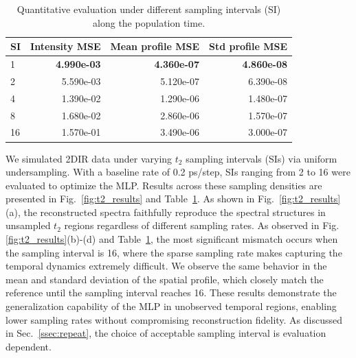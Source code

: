 \documentclass{optica-article}
\begin{document}
\begin{table}[t]
\centering
\caption{Quantitative evaluation under different sampling intervals (SI) along the population time.}
\label{tab:t2_results}
\begin{tabular}{lrrr}
\toprule
SI & Intensity MSE & Mean profile MSE & Std profile MSE \\
\midrule
1  & \textbf{4.990e-03} & \textbf{4.360e-07} & \textbf{4.860e-08} \\
2  & 5.590e-03 & 5.120e-07 & 6.390e-08 \\
4  & 1.390e-02 & 1.290e-06 & 1.480e-07 \\
8  & 1.680e-02 & 2.860e-06 & 1.570e-07 \\
16 & 1.570e-01 & 3.490e-06 & 3.000e-07 \\
\bottomrule
\end{tabular}
\vspace{-3mm}
\end{table}

We simulated 2DIR data under varying $t_2$ sampling intervals (SIs) via uniform undersampling. With a baseline rate of 0.2 ps/step, SIs ranging from 2 to 16 were evaluated to optimize the MLP. Results across these sampling densities are presented in Fig.~\ref{fig:t2_results} and Table~\ref{tab:t2_results}. As shown in Fig.~\ref{fig:t2_results}(a), the reconstructed spectra faithfully reproduce the spectral structures in unsampled $t_2$ regions regardless of different sampling rates. As observed in Fig.\ref{fig:t2_results}(b)-(d) and Table~\ref{tab:t2_results}, the most significant mismatch occurs when the sampling interval is 16, where the sparse sampling rate makes capturing the temporal dynamics extremely difficult. We observe the same behavior in the mean and standard deviation of the spatial profile, which closely match the reference until the sampling interval reaches 16. These results demonstrate the generalization capability of the MLP in unobserved temporal regions, enabling lower sampling rates without compromising reconstruction fidelity. As discussed in Sec.~\ref{ssec:repeat}, the choice of acceptable sampling interval is evaluation dependent.


\end{document}
